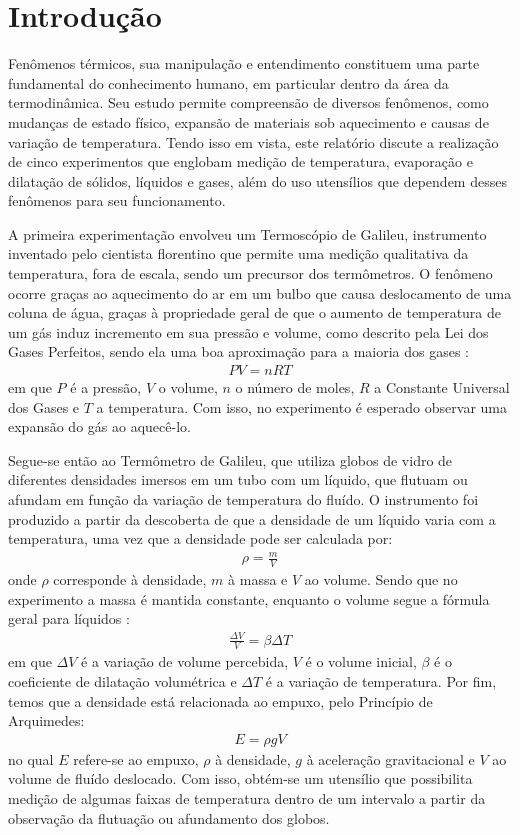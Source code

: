 \section{Introdução}
Fenômenos  térmicos, sua manipulação e entendimento constituem uma parte fundamental do conhecimento humano, em particular dentro da área da termodinâmica. Seu estudo permite compreensão de diversos fenômenos, como mudanças de estado físico, expansão de materiais sob aquecimento e causas de variação de temperatura. Tendo isso em vista, este relatório discute a realização de cinco experimentos que englobam medição de temperatura, evaporação e dilatação de sólidos, líquidos e gases, além do uso utensílios que dependem desses fenômenos para seu funcionamento.

A primeira experimentação envolveu um Termoscópio de Galileu, instrumento inventado pelo cientista florentino que permite uma medição qualitativa da temperatura, fora de escala, sendo um precursor dos termômetros. O fenômeno ocorre graças ao aquecimento do ar em um bulbo que causa deslocamento de uma coluna de água, graças à propriedade geral de que o aumento de temperatura de um gás induz incremento em sua pressão e volume, como descrito pela Lei dos Gases Perfeitos, sendo ela uma boa aproximação para a maioria dos gases \cite{Nussenzveig_2014}:
\begin{align*}
PV = nRT    
\end{align*}
em que \(P\) é a pressão, \(V\) o volume, \(n\) o número de moles, \(R\) a Constante Universal dos Gases e \(T\) a temperatura. Com isso, no experimento é esperado observar uma expansão do gás ao aquecê-lo.

Segue-se então ao Termômetro de Galileu, que utiliza globos de vidro de diferentes densidades imersos em um tubo com um líquido, que flutuam ou afundam em função da variação de temperatura do fluído. O instrumento foi produzido a partir da descoberta de que a densidade de um líquido varia com a temperatura, uma vez que a densidade pode ser calculada por:
\begin{align*}
\rho = \frac{m}{V}    
\end{align*}
onde \(\rho\) corresponde à densidade, \(m\) à massa e \(V\) ao volume. Sendo que no experimento a massa é mantida constante, enquanto o volume segue a fórmula geral para líquidos \cite{Nussenzveig_2014}:
\begin{align*}
\frac{\Delta V}{V} = \beta \Delta T    
\end{align*}
em que \(\Delta V\) é a variação de volume percebida, \(V\) é o volume inicial, \(\beta\) é o coeficiente de dilatação volumétrica e \(\Delta T\) é a variação de temperatura. Por fim, temos que a densidade está relacionada ao empuxo, pelo Princípio de Arquimedes:
\begin{align*}
    E = \rho g V
\end{align*}
no qual \(E\) refere-se ao empuxo, \(\rho\) à densidade, \(g\) à aceleração gravitacional e \(V\) ao volume de fluído deslocado. Com isso, obtém-se um utensílio que possibilita medição de algumas faixas de temperatura dentro de um intervalo a partir da observação da flutuação ou afundamento dos globos.


